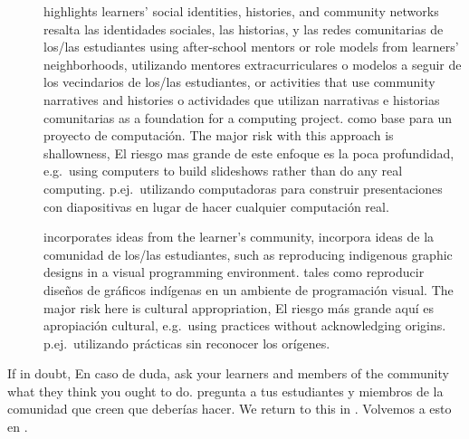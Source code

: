 \begin{description}

\item[{}]
\item[{}]
  highlights learners' social identities, histories, and community networks
  resalta las identidades sociales, las historias, y las redes comunitarias de los/las estudiantes
  using after-school mentors or role models from learners' neighborhoods,
  utilizando mentores extracurriculares o modelos a seguir de los vecindarios de los/las estudiantes,
  or activities that use community narratives and histories
  o actividades que utilizan narrativas e historias comunitarias
  as a foundation for a computing project.
  como base para un proyecto de computación.
  The major risk with this approach is shallowness,
  El riesgo mas grande de este enfoque es la poca profundidad,
  e.g.\ using computers to build slideshows rather than do any real computing.
  p.ej.\ utilizando computadoras para construir presentaciones con diapositivas en lugar de hacer cualquier computación real.

\item[{}]
\item[{}]
  incorporates ideas from the learner's community,
  incorpora ideas de la comunidad de los/las estudiantes,
  such as reproducing indigenous graphic designs in a visual programming environment.
  tales como reproducir diseños de gráficos indígenas en un ambiente de programación visual.
  The major risk here is cultural appropriation,
  El riesgo más grande aquí es apropiación cultural,
  e.g.\ using practices without acknowledging origins.
  p.ej.\ utilizando prácticas sin reconocer los orígenes.

\end{description}

If in doubt,
En caso de duda,
ask your learners and members of the community what they think you ought to do.
pregunta a tus estudiantes y miembros de la comunidad que creen que deberías hacer.
We return to this in .
Volvemos a esto en .

